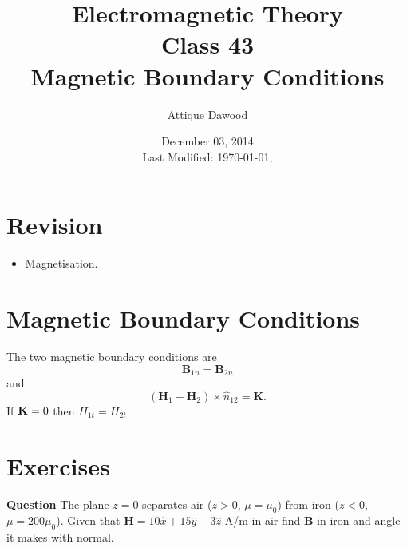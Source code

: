 \documentclass[12pt,a4paper]{article}
\title{Electromagnetic Theory\\Class 43\\Magnetic Boundary Conditions}
\author{Attique Dawood}
\date{December 03, 2014\\[0.2cm] Last Modified: \today, \currenttime}
\begin{document}
\maketitle
\section{Revision}
\begin{itemize}
\item Magnetisation.
\end{itemize}
\section{Magnetic Boundary Conditions}
The two magnetic boundary conditions are
\begin{equation}
\mathrm{\textbf{B}}_{1n}=\mathrm{\textbf{B}}_{2n}
\end{equation}
and
\begin{equation}
\left(\mathrm{\textbf{H}}_1-\mathrm{\textbf{H}}_2\right)\times\hat n_{12}=\mathrm{\textbf{K}}.
\end{equation}
If $\mathrm{\textbf K}=0$ then $H_{1t}=H_{2t}$.
\section{Exercises}
\noindent\textbf{Question} The plane $z=0$ separates air ($z>0$, $\mu=\mu_0$) from iron ($z<0$, $\mu=200\mu_0$). Given that $\mathrm{\textbf{H}}=10\hat x+15\hat y-3\hat z$ A/m in air find \textbf{B} in iron and angle it makes with normal.


\end{document}
